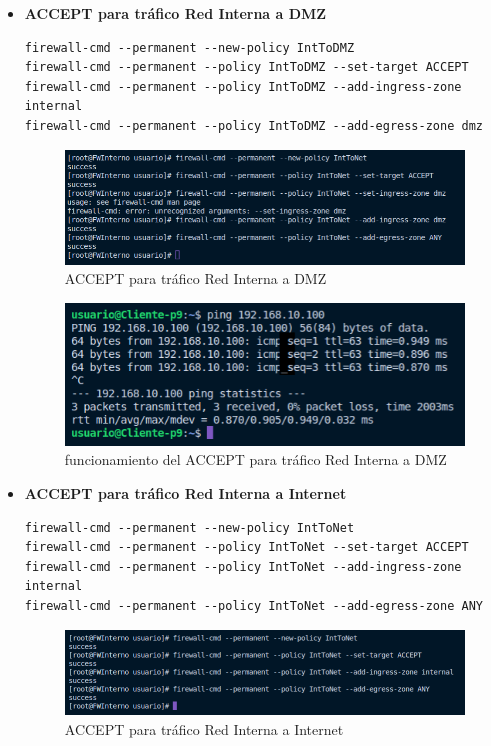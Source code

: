 \documentclass[11pt]{report}
\begin{document}
\begin{itemize}
  \cleardoublepage

  \item \textbf{ACCEPT para tráfico Red Interna a DMZ}
  \begin{verbatim}
firewall-cmd --permanent --new-policy IntToDMZ
firewall-cmd --permanent --policy IntToDMZ --set-target ACCEPT
firewall-cmd --permanent --policy IntToDMZ --add-ingress-zone internal
firewall-cmd --permanent --policy IntToDMZ --add-egress-zone dmz
  \end{verbatim}
  \begin{figure}[H]
    \centering
    \includegraphics[scale=0.55]{img/accept_int_to_dmz.png}
    \caption{ACCEPT para tráfico Red Interna a DMZ}
    \label{fig:ACCEPT para tráfico Red Interna a DMZ}
  \end{figure}
  \begin{figure}[H]
    \centering
    \includegraphics[scale=0.63]{img/funcionamiento_int_to_dmz.png}
    \caption{funcionamiento del ACCEPT para tráfico Red Interna a DMZ}
    \label{fig:funcionamiento ACCEPT para tráfico Red Interna a DMZ}
  \end{figure}

  \cleardoublepage

  \item \textbf{ACCEPT para tráfico Red Interna a Internet}
  \begin{verbatim}
firewall-cmd --permanent --new-policy IntToNet
firewall-cmd --permanent --policy IntToNet --set-target ACCEPT
firewall-cmd --permanent --policy IntToNet --add-ingress-zone internal
firewall-cmd --permanent --policy IntToNet --add-egress-zone ANY
  \end{verbatim}
  \begin{figure}[H]
    \centering
    \includegraphics[scale=0.5]{img/accept_int_to_net.png}
    \caption{ACCEPT para tráfico Red Interna a Internet}
    \label{fig:ACCEPT para tráfico Red Interna a Internet}
  \end{figure}


\end{itemize}
\end{document}
